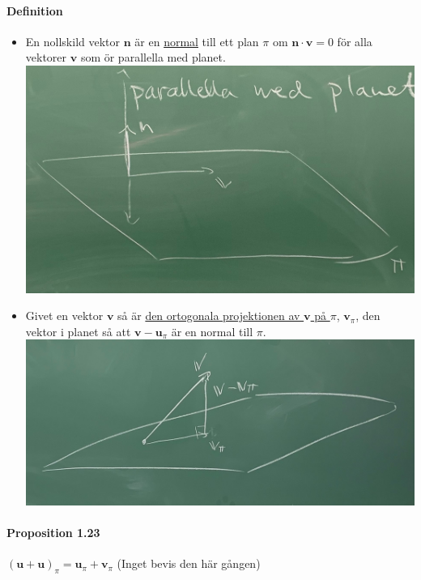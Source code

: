     \paragraph{Definition} \begin{itemize}
        \item En nollskild vektor $\bm{n}$ är en \underline{normal} till ett plan $\pi$ om $\bm{n}\cdot \bm{v} = 0$ för alla vektorer $\bm{v}$ som ör parallella med planet.\\
            \includegraphics[scale=0.15]{imgs/22-01-20-img06.jpg}
        \item Givet en vektor $\bm{v}$ så är \underline{den ortogonala projektionen av $\bm{v}$ på $\pi$}, $\bm{v}_{\pi}$, den vektor i planet så att $\bm{v}-\bm{u}_{\pi}$ är en normal till $\pi$.\\
            \includegraphics[scale=0.15]{imgs/22-01-20-img07.jpg}
    \end{itemize}
    
    \paragraph{Proposition 1.23} $(\bm{u} + \bm{u})_{\pi}=\bm{u}_{\pi} + \bm{v}_{\pi}$ (Inget bevis den här gången)

